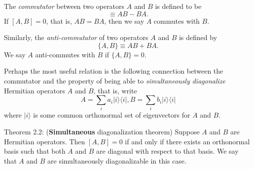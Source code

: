 The \textit{commutator} between two operators $A$ and $B$ is defined to be
\begin{equation}
    [A, B] \equiv A B-B A.
\end{equation}
If $[A, B]=0$, that is, $A B=B A$, then we say $A$ commutes with $B$. 

Similarly, the \textit{anti-commutator} of two operators $A$ and $B$ is defined by
\begin{equation}
    \{A, B\} \equiv A B+B A.
\end{equation}
We say $A$ anti-commutes with $B$ if $\{A, B\}=0$. 


Perhaps the most useful relation is the following connection between the commutator and the property of being able to \textit{simultaneously diagonalize} Hermitian operators $A$ and $B$, that is, write 
\begin{equation}
    A=\sum_{i} a_{i}|i\rangle\langle i|, B=\sum_{i} b_{i}| i\rangle\langle i|
\end{equation}
where $|i\rangle$ is some common orthonormal set of eigenvectors for $A$ and $B$.

\begin{theorem}
    Theorem 2.2: (\textbf{Simultaneous} diagonalization theorem) Suppose $A$ and $B$ are Hermitian operators. Then $[A, B]=0$ if and only if there exists an orthonormal basis such that both $A$ and $B$ are diagonal with respect to that basis. We say that $A$ and $B$ are simultaneously diagonalizable in this case.
\end{theorem}

